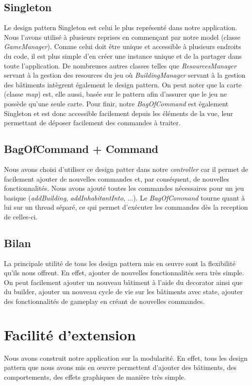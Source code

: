 \documentclass{article}
\begin{document}
\subsection{Singleton}
Le design pattern Singleton est celui le plus représenté dans notre application. Nous l'avons utilisé à plusieurs reprises en commençant par
notre model (classe \textit{GameManager}). Comme celui doit être unique et accessible à plusieurs endroits du code, il est plus simple d'en créer 
une instance unique et de la partager dans toute l'application. De nombreuses autres classes telles que \textit{ResourcesManager} servant à la gestion
des resources du jeu où \textit{BuildingManager} servant à la gestion des bâtiments intègrent également le design pattern. On peut noter que la carte 
(classe \textit{map}) est, elle aussi, basée sur le pattern afin d'assurer que le jeu ne possède qu'une seule carte. Pour finir, notre \textit{BagOfCommand}
est également Singleton et est donc accessible facilement depuis les éléments de la vue, leur permettant de déposer facilement des commandes à traiter.

\subsection{BagOfCommand + Command}
Nous avons choisi d'utiliser ce design patter dans notre \textit{controller} car il permet de facilement ajouter de nouvelles commandes et, par conséquent,
de nouvelles fonctionnalités. Nous avons ajouté toutes les commandes nécessaires pour un jeu basique (\textit{addBuilding}, \textit{addInhabitantInto}, ...).
Le \textit{BagOfCommand} tourne quant à lui sur un thread séparé, ce qui permet d'exécuter les commandes dès la reception de celles-ci.

\subsection{Bilan}
La principale utilité de tous les design pattern mis en œuvre sont la flexibilité qu'ils nous offrent. En effet, ajouter de nouvelles fonctionnalités sera
très simple. On peut facilement ajouter un nouveau bâtiment à l'aide du decorator ainsi que du builder, ajouter un nouveau cycle de vie sur les bâtiments 
avec state, ajouter des fonctionnalités de gameplay en créant de nouvelles commandes.

\section{Facilité d'extension}
Nous avons construit notre application sur la modularité. En effet, tous les design pattern que nous avons mis en œuvre permettent d'ajouter des bâtiments,
des comportements, des effets graphiques de manière très simple.
\end{document}
